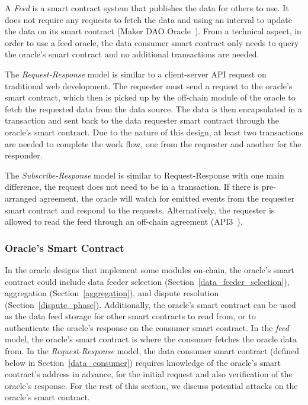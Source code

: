 A \textit{Feed} is a smart contract system that publishes the data for others to use. It does not require any requests to fetch the data and using an interval to update the data on its smart contract (\eg Maker DAO Oracle~\cite{MAKERDAOOracle}). From a technical aspect, in order to use a feed oracle, the data consumer smart contract only needs to query the oracle's smart contract and no additional transactions are needed. 

The \textit{Request-Response} model is similar to a client-server API request on traditional web development. The requester must send a request to the oracle's smart contract, which then is picked up by the off-chain module of the oracle to fetch the requested data from the data source. The data is then encapsulated in a transaction and sent back to the data requester smart contract through the oracle's smart contract. Due to the nature of this design, at least two transactions are needed to complete the work flow, one from the requester and another for the responder.

The \textit{Subscribe-Response} model is similar to Request-Response with one main difference, the request does not need to be in a transaction. If there is pre-arranged agreement, the oracle will watch for emitted events from the requester smart contract and respond to the requests. Alternatively, the requester is allowed to read the feed through an off-chain agreement (\eg API3~\cite{benligiraydecentralized}). 


\subsubsection{Oracle's Smart Contract}\label{oracle_smart_contract} 

In the oracle designs that implement some modules on-chain, the oracle's smart contract could include data feeder selection (Section~\ref{data_feeder_selection}), aggregation (Section~\ref{aggregation}), and dispute resolution (Section~\ref{dispute_phase}). Additionally, the oracle's smart contract can be used as the data feed storage for other smart contracts to read from, or to authenticate the oracle's response on the consumer smart contract.  In the \textit{feed} model, the oracle's smart contract is where the consumer fetches the oracle data from. In the \textit{Request-Response} model, the data consumer smart contract (defined below in Section~\ref{data_consumer}) requires knowledge of the oracle's smart contract's address in advance, for the initial request and also verification of the oracle's response. For the rest of this section, we discuss potential attacks on the oracle's smart contract.

